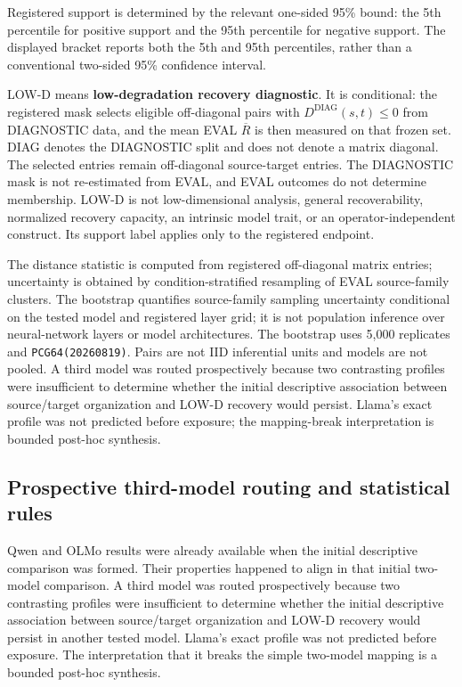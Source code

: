 \documentclass{article}
\begin{document}
Registered support is determined by the relevant one-sided 95\% bound: the 5th percentile for positive support and the 95th percentile for negative support. The displayed bracket reports both the 5th and 95th percentiles, rather than a conventional two-sided 95\% confidence interval.

LOW-D means \textbf{low-degradation recovery diagnostic}. It is conditional: the registered mask selects eligible off-diagonal pairs with $D^{\mathrm{DIAG}}(s,t)\leq0$ from DIAGNOSTIC data, and the mean EVAL $\overline R$ is then measured on that frozen set. DIAG denotes the DIAGNOSTIC split and does not denote a matrix diagonal. The selected entries remain off-diagonal source-target entries. The DIAGNOSTIC mask is not re-estimated from EVAL, and EVAL outcomes do not determine membership. LOW-D is not low-dimensional analysis, general recoverability, normalized recovery capacity, an intrinsic model trait, or an operator-independent construct. Its support label applies only to the registered endpoint.

The distance statistic is computed from registered off-diagonal matrix entries; uncertainty is obtained by condition-stratified resampling of EVAL source-family clusters. The bootstrap quantifies source-family sampling uncertainty conditional on the tested model and registered layer grid; it is not population inference over neural-network layers or model architectures. The bootstrap uses 5,000 replicates and \texttt{PCG64(20260819)}. Pairs are not IID inferential units and models are not pooled. A third model was routed prospectively because two contrasting profiles were insufficient to determine whether the initial descriptive association between source/target organization and LOW-D recovery would persist. Llama's exact profile was not predicted before exposure; the mapping-break interpretation is bounded post-hoc synthesis.

\subsection{Prospective third-model routing and statistical rules}
Qwen and OLMo results were already available when the initial descriptive comparison was formed. Their properties happened to align in that initial two-model comparison. A third model was routed prospectively because two contrasting profiles were insufficient to determine whether the initial descriptive association between source/target organization and LOW-D recovery would persist in another tested model. Llama's exact profile was not predicted before exposure. The interpretation that it breaks the simple two-model mapping is a bounded post-hoc synthesis.
\end{document}
